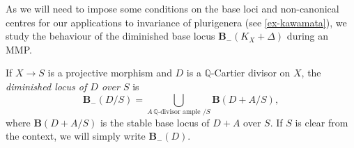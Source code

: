 \documentclass[a4paper,12pt]{book}
\newcommand{\cent}{\textup{centre}}
\begin{document}
%	
	As we will need to impose some conditions on the base loci and non-canonical centres for our applications to invariance of plurigenera (see \autoref{ex-kawamata}), we study the behaviour of the diminished base locus $\mathbf{B}_{-}(K_X+\Delta)$ during an MMP. 
	
	\begin{definition}
	If $X \to S$ is a projective morphism and $D$ is a $\mathbb{Q}$-Cartier divisor on $X$, the \emph{diminished locus of $D$ over $S$}  is  $$\mathbf{B}_{-}(D/S) = \bigcup_{A \, \mathbb{Q}\text{-divisor} \text{ ample }/S} \mathbf{B}(D+A/S),$$ where $\mathbf{B}(D+A/S)$ is the stable base locus of $D+A$ over $S$. If $S$ is clear from the context, we will simply write $\mathbf{B}_{-}(D)$.
	\end{definition}
\end{document}
